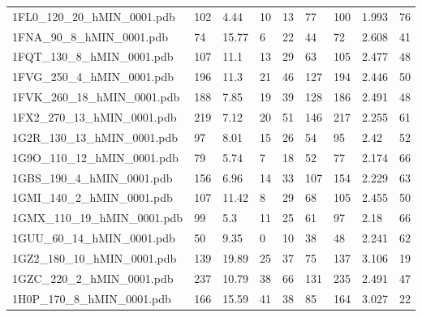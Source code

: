 \documentclass{bioinfo}
\begin{document}
\begin{table}[!t]
{\begin{tabular}{lllllllll}
    1FL0\_120\_20\_hMIN\_0001.pdb & 102      & 4.44       & 10          & 13          & 77          & 100     & 1.993           & 76           \\
    1FNA\_90\_8\_hMIN\_0001.pdb & 74       & 15.77      & 6           & 22          & 44          & 72      & 2.608           & 41           \\
    1FQT\_130\_8\_hMIN\_0001.pdb & 107      & 11.1       & 13          & 29          & 63          & 105     & 2.477           & 48           \\
    1FVG\_250\_4\_hMIN\_0001.pdb & 196      & 11.3       & 21          & 46          & 127         & 194     & 2.446           & 50           \\
    1FVK\_260\_18\_hMIN\_0001.pdb & 188      & 7.85       & 19          & 39          & 128         & 186     & 2.491           & 48           \\
    1FX2\_270\_13\_hMIN\_0001.pdb & 219      & 7.12       & 20          & 51          & 146         & 217     & 2.255           & 61           \\
    1G2R\_130\_13\_hMIN\_0001.pdb & 97       & 8.01       & 15          & 26          & 54          & 95      & 2.42            & 52           \\
    1G9O\_110\_12\_hMIN\_0001.pdb & 79       & 5.74       & 7           & 18          & 52          & 77      & 2.174           & 66           \\
    1GBS\_190\_4\_hMIN\_0001.pdb & 156      & 6.96       & 14          & 33          & 107         & 154     & 2.229           & 63           \\
    1GMI\_140\_2\_hMIN\_0001.pdb & 107      & 11.42      & 8           & 29          & 68          & 105     & 2.455           & 50           \\
    1GMX\_110\_19\_hMIN\_0001.pdb & 99       & 5.3        & 11          & 25          & 61          & 97      & 2.18            & 66           \\
    1GUU\_60\_14\_hMIN\_0001.pdb & 50       & 9.35       & 0           & 10          & 38          & 48      & 2.241           & 62           \\
    1GZ2\_180\_10\_hMIN\_0001.pdb & 139      & 19.89      & 25          & 37          & 75          & 137     & 3.106           & 19           \\
    1GZC\_220\_2\_hMIN\_0001.pdb & 237      & 10.79      & 38          & 66          & 131         & 235     & 2.491           & 47           \\
    1H0P\_170\_8\_hMIN\_0001.pdb & 166      & 15.59      & 41          & 38          & 85          & 164     & 3.027           & 22           \\

\end{tabular}}
\end{table}
\end{document}
